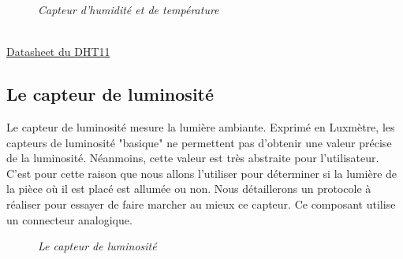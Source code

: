 \begin{figure}[H]
\begin{center}
\end{center}
	\caption{ \textit{Capteur d'humidité et de température}}
\end{figure}\\

\href{https://akizukidenshi.com/download/ds/aosong/DHT11.pdf}{Datasheet du DHT11}

\subsection{Le capteur de luminosité}

Le capteur de luminosité mesure la lumière ambiante. Exprimé en Luxmètre, les capteurs de luminosité "basique" ne permettent pas d'obtenir une valeur précise de la luminosité. Néanmoins, cette valeur est très abstraite pour l'utilisateur. C'est pour cette raison que nous allons l'utiliser pour déterminer si la lumière de la pièce où il est placé est allumée ou non. Nous détaillerons un protocole à réaliser pour essayer de faire marcher au mieux ce capteur. Ce composant utilise un connecteur analogique.\\

\begin{figure}[H]
\begin{center}
\end{center}
	\caption{ \textit{Le capteur de luminosité}}
\end{figure}\\

